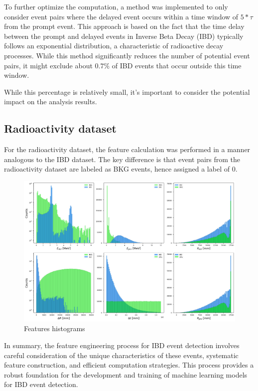 To further optimize the computation, a method was implemented to only consider event pairs where the delayed event occurs within a time window of $5*\tau$ from the prompt event. This approach is based on the fact that the time delay between the prompt and delayed events in Inverse Beta Decay (IBD) typically follows an exponential distribution, a characteristic of radioactive decay processes. While this method significantly reduces the number of potential event pairs, it might exclude about $0.7\%$ of IBD events that occur outside this time window. 

While this percentage is relatively small, it's important to consider the potential impact on the analysis results.

\subsection{Radioactivity dataset}
For the radioactivity dataset, the feature calculation was performed in a manner analogous to the IBD dataset. The key difference is that event pairs from the radioactivity dataset are labeled as BKG events, hence assigned a label of 0.


\begin{figure}[h]
	\centering
	\includegraphics[width=1\linewidth]{Images/hist_features.png}
	\caption{Features histograms}
	\label{fig:hist_features}
\end{figure}



In summary, the feature engineering process for IBD event detection involves careful consideration of the unique characteristics of these events, systematic feature construction, and efficient computation strategies. This process provides a robust foundation for the development and training of machine learning models for IBD event detection.

